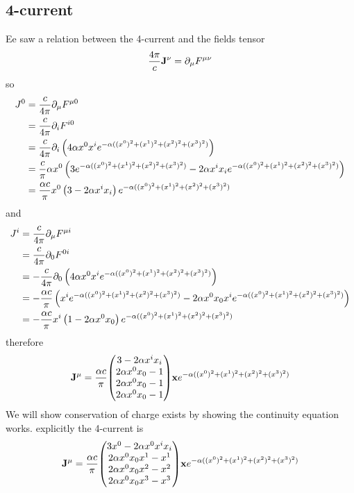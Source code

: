 \subsection{4-current}
Ee saw a relation between the 4-current and the fields tensor
\begin{equation}
  \frac{4\pi}{c}\bold J^\nu = \partial_\mu\tensor{F}{^\mu^\nu}
\end{equation}
so
\begin{align}
	J^0&=\frac{c}{4\pi}\partial_\mu\tensor{F}{^\mu^0}\\
	&= \frac{c}{4\pi}\partial_i\tensor{F}{^i^0}\\
	&= \frac{c}{4\pi}\partial_i\ins{4\alpha x^0x^ie^{-\alpha((x^0)^2+(x^1)^2+(x^2)^2+(x^3)^2)}}\\
	&= \frac{c}{\pi}\alpha x^0\ins{3e^{-\alpha((x^0)^2+(x^1)^2+(x^2)^2+(x^3)^2)}-2\alpha x^ix_ie^{-\alpha((x^0)^2+(x^1)^2+(x^2)^2+(x^3)^2)}}\\
	&= \frac{\alpha c}{\pi}x^0\ins{3-2\alpha x^ix_i}e^{-\alpha((x^0)^2+(x^1)^2+(x^2)^2+(x^3)^2)}
\end{align}
and
\begin{align}
	J^i&= \frac{c}{4\pi}\partial_\mu\tensor{F}{^\mu^i}\\
	&= \frac{c}{4\pi}\partial_0\tensor{F}{^0^i}\\
	&= -\frac{c}{4\pi}\partial_0\ins{4\alpha x^0x^ie^{-\alpha((x^0)^2+(x^1)^2+(x^2)^2+(x^3)^2)}}\\
	&= -\frac{\alpha c}{\pi}\ins{x^ie^{-\alpha((x^0)^2+(x^1)^2+(x^2)^2+(x^3)^2)}-2\alpha x^0x_0x^ie^{-\alpha((x^0)^2+(x^1)^2+(x^2)^2+(x^3)^2)}}\\
	&= -\frac{\alpha c}{\pi}x^i\ins{1-2\alpha x^0x_0}e^{-\alpha((x^0)^2+(x^1)^2+(x^2)^2+(x^3)^2)}
\end{align}
therefore
\begin{equation}
  \bold J^\mu = \frac{\alpha c}{\pi}\mqty(3-2\alpha x^ix_i\\2\alpha x^0x_0-1\\2\alpha x^0x_0-1\\2\alpha x^0x_0-1)\bold xe^{-\alpha((x^0)^2+(x^1)^2+(x^2)^2+(x^3)^2)}
\end{equation}
We will show conservation of charge exists by showing the continuity equation works. explicitly the 4-current is
\begin{equation}
  \bold J^\mu = \frac{\alpha c}{\pi}\mqty(3x^0-2\alpha x^0x^ix_i\\2\alpha x^0x_0x^1-x^1\\2\alpha x^0x_0x^2-x^2\\2\alpha x^0x_0x^3-x^3)\bold x e^{-\alpha((x^0)^2+(x^1)^2+(x^2)^2+(x^3)^2)}
\end{equation}
